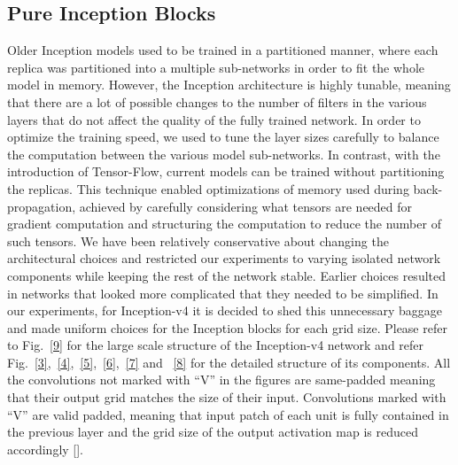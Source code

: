 \documentclass[a4paper,12pt, twoside]{NITKReport}
\begin{document}
\subsection{Pure Inception Blocks}
Older Inception models used to be trained in a partitioned manner, where each replica was partitioned into a multiple sub-networks in order to fit the whole model in memory.  However, the Inception architecture is highly  tunable,  meaning  that  there  are  a  lot  of  possible changes to the number of filters in the various layers that do  not  affect  the  quality  of  the  fully  trained  network. In order to optimize the training speed,  we used to tune the layer sizes carefully to balance the computation between the various model sub-networks. In contrast, with the introduction of Tensor-Flow, current models can be trained without partitioning the replicas. This technique enabled optimizations of memory used during back-propagation, achieved by carefully considering what tensors are needed for gradient computation and structuring the computation to reduce the number of such tensors. We have been relatively conservative about changing the architectural choices and restricted our experiments to varying isolated network components while keeping the rest of the network stable. Earlier choices resulted in networks that looked more complicated that they needed to be simplified. In our experiments, for Inception-v4 it is decided to shed this unnecessary baggage and made uniform choices for the Inception blocks for each grid size.  Please refer to Fig.~\ref{9} for the large scale structure of the Inception-v4 network and refer Fig.~\ref{3},~\ref{4},~\ref{5},~\ref{6},~\ref{7} and ~\ref{8} for the detailed structure  of  its  components. All the convolutions not  marked with “V” in the figures are same-padded meaning that their output grid matches the size of their input. Convolutions marked with “V” are valid padded, meaning that input patch of each unit is fully contained in the previous layer and the grid  size  of  the  output  activation  map  is  reduced  accordingly [\cite{DBLP:journals/corr/SzegedyIV16}].
\end{document}
